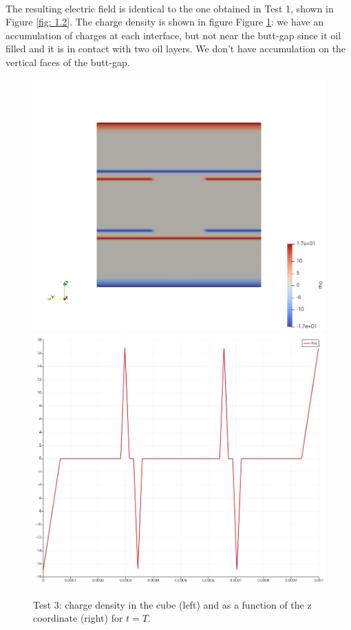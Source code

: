 \documentclass{Configuration_Files/PoliMi3i_thesis}
\begin{document}
\\The resulting electric field is identical to the one obtained in Test 1, shown in Figure \ref{fig: 1.2}. 
The charge density is shown in figure Figure \ref{fig: 3.3}: we have an accumulation of charges at each interface, but not near the butt-gap since it oil filled and it is in contact with two oil layers. We don't have accumulation on the vertical faces of the butt-gap.
\begin{figure}[h!]
    \centering
   \includegraphics[scale=0.2]{Images/3.rho_3d.jpeg}
   \includegraphics[scale=0.2]{Images/3.rho.jpeg}
    \caption {Test 3: charge density in the cube (left) and as a function of the z coordinate (right) for $t=T$.}
    \label{fig: 3.3}
\end{figure}
\end{document}

